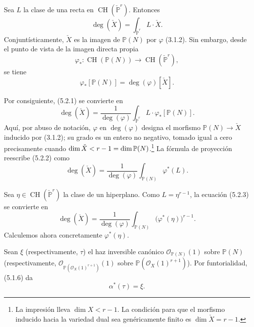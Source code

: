 Sea $L$ la clase de una recta en
$\operatorname{CH}(\check{\mathbb P}^{r})$. Entonces
\begin{equation}\tag{5.2.1}
\deg(\check X)
=\int_{\check{\mathbb P}^{r}}L\cdot\check X.
\end{equation}
Conjuntísticamente, $\check X$ es la imagen de $\mathbb P(N)$ por
$\varphi$ (3.1.2). Sin embargo, desde el punto de vista de la imagen
directa propia
\[
\varphi_*:\operatorname{CH}(\mathbb P(N))
\longrightarrow\operatorname{CH}(\check{\mathbb P}^{r}),
\]
se tiene
\[
\varphi_*[\mathbb P(N)]=\deg(\varphi)[\check X].
\]

\pageoriginale

Por consiguiente, (5.2.1) se convierte en
\begin{equation}\tag{5.2.2}
\deg(\check X)
=\frac{1}{\deg(\varphi)}
\int_{\check{\mathbb P}^{r}}L\cdot\varphi_*[\mathbb P(N)].
\end{equation}
Aquí, por abuso de notación, $\varphi$ en $\deg(\varphi)$ designa el
morfismo $\mathbb P(N)\to\check X$ inducido por (3.1.2); su grado es un
entero no negativo, tomado igual a cero precisamente cuando
$\dim\sisi{X}{\check X}<r-1=\dim\mathbb P(N)$.\footnote{La impresión
lleva $\dim X<r-1$. La condición para que el morfismo inducido hacia la
variedad dual sea genéricamente finito es $\dim\check X=r-1$.}
La fórmula de proyección reescribe (5.2.2) como
\begin{equation}\tag{5.2.3}
\deg(\check X)
=\frac{1}{\deg(\varphi)}
\int_{\mathbb P(N)}\varphi^*(L).
\end{equation}

Sea $\eta\in\operatorname{CH}(\check{\mathbb P}^{r})$ la clase de un
hiperplano. Como $L=\eta^{r-1}$, la ecuación (5.2.3) se convierte en
\begin{equation}\tag{5.2.4}
\deg(\check X)
=\frac{1}{\deg(\varphi)}
\int_{\mathbb P(N)}\bigl(\varphi^*(\eta)\bigr)^{r-1}.
\end{equation}
Calculemos ahora concretamente $\varphi^*(\eta)$.

Sean $\xi$ (respectivamente, $\tau$) el haz inversible canónico
$\mathcal O_{\mathbb P(N)}(1)$ sobre $\mathbb P(N)$ (respectivamente,
$\mathcal O_{\mathbb P(\mathcal O_X(1)^{r+1})}(1)$ sobre
$\mathbb P(\mathcal O_X(1)^{r+1})$). Por funtorialidad, (5.1.6) da
\begin{equation}\tag{5.2.5}
\alpha^*(\tau)=\xi.
\end{equation}

\pageoriginale


